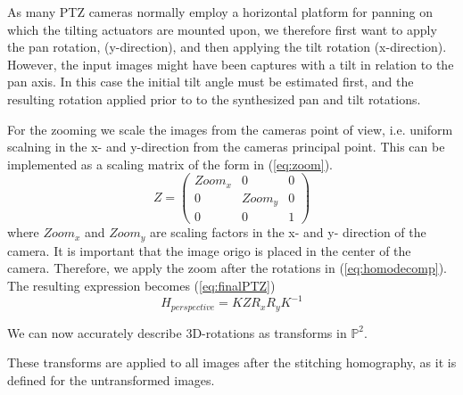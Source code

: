As many PTZ cameras normally employ a horizontal platform for panning on which the tilting actuators are mounted upon, we therefore first want to apply the pan rotation, (y-direction), and then applying the tilt rotation (x-direction).
However, the input images might have been captures with a tilt in relation to the pan axis.
In this case the initial tilt angle must be estimated first, and the resulting rotation applied prior to to the synthesized pan and tilt rotations.

	For the zooming we scale the images from the cameras point of view, i.e. uniform scalning in the x- and y-direction from the cameras principal point. 
	This can be implemented as a scaling matrix of the form in (\ref{eq:zoom}).
	\begin{equation}
		Z=\begin{pmatrix} 
			Zoom_x & 0 & 0 \\
			0 & Zoom_y & 0 \\
			0 & 0 & 1
		\end{pmatrix}
		\label{eq:zoom}
	\end{equation}
	where $Zoom_x$ and $Zoom_y$ are scaling factors in the x- and y- direction of the camera.
	It is important that the image origo is placed in the center of the camera.
	Therefore, we apply the zoom after the rotations in (\ref{eq:homodecomp}). The resulting expression becomes (\ref{eq:finalPTZ})
	\begin{equation}
		H_{perspective}=K Z  R_{x}R_{y}  K^{-1}
		\label{eq:finalPTZ}
	\end{equation}

	We can now accurately describe 3D-rotations as transforms in $\mathbb{P}^2$.

These transforms are applied to all images after the stitching homography, as it is defined for the untransformed images.
